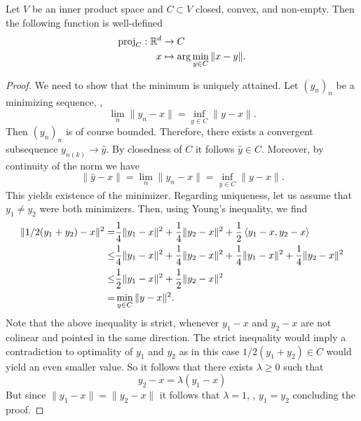 \begin{theorem}
    Let $V$ be an inner product space and $C\subset V$ closed, convex, and non-empty. Then the following function is well-defined
    \begin{equation}
        \begin{aligned}
            \mathrm{proj}_C:\mathbb{R}^d&\rightarrow C\\
            x&\mapsto\arg\min_{y\in C}\|x-y\|.
        \end{aligned}
    \end{equation}
\end{theorem}
\begin{proof}
    We need to show that the minimum is uniquely attained.
    Let $(y_n)_n$ be a minimizing sequence, \ie,
    \begin{equation}
        \lim_n \|y_n-x\| = \inf_{y\in C}\|y-x\|.
    \end{equation}
    Then $(y_n)_n$ is of course bounded. Therefore, there exists a convergent subsequence $y_{n(k)}\rightarrow \hat y$. By closedness of $C$ it follows $\hat y \in C$. Moreover, by continuity of the norm we have
    \begin{equation}
        \|\hat y-x\| = \lim_n \|y_n-x\| = \inf_{y\in C}\|y-x\|.
    \end{equation}
    This yields existence of the minimizer. Regarding uniqueness, let us assume that $y_1\neq y_2$ were both minimizers. Then, using Young's inequality, we find 
    \begin{equation}
        \begin{aligned}
            \| 1/2 (y_1+y_2) - x\|^2 
            =& \frac{1}{4}\|y_1-x\|^2 + \frac{1}{4}\|y_2-x\|^2 + \frac{1}{2}\left\langle y_1-x , y_2-x\right\rangle\\
            \leq& \frac{1}{4}\|y_1-x\|^2 + \frac{1}{4}\|y_2-x\|^2 + \frac{1}{4}\|y_1-x\|^2 + \frac{1}{4}\|y_2-x\|^2\\
            \leq& \frac{1}{2}\|y_1-x\|^2 + \frac{1}{2}\|y_2-x\|^2\\
            =& \min_{y\in C}\|y-x\|^2.
        \end{aligned}
    \end{equation}
    Note that the above inequality is strict, whenever $y_1-x$ and $y_2-x$ are not colinear and pointed in the same direction. 
    The strict inequality would imply a contradiction to optimality of $y_1$ and $y_2$ as in this case $1/2(y_1+y_2)\in C$ would yield an even smaller value. So it follows that there exists $\lambda\geq 0$ such that
    \[
        y_2-x = \lambda (y_1-x)
    \]
    But since $\|y_1-x\|=\|y_2-x\|$ it follows that $\lambda=1$, \ie, $y_1=y_2$ concluding the proof.
\end{proof}
